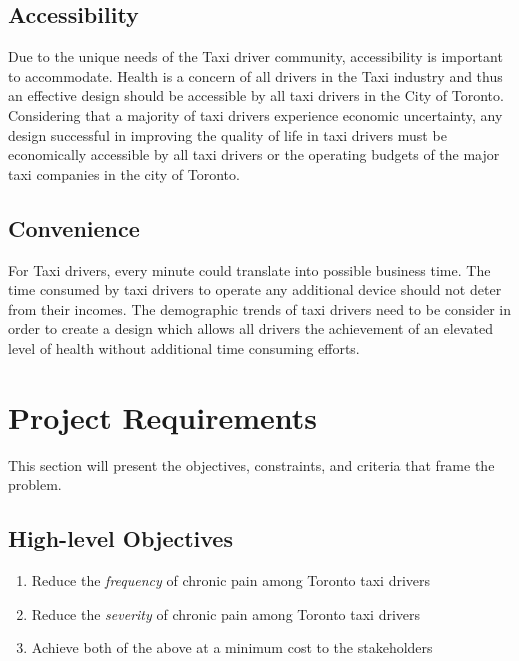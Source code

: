 \documentclass[11pt]{article}
\begin{document}
\subsection{Accessibility}
Due to the unique needs of the Taxi driver community, accessibility is 
important to accommodate. Health is a concern of all drivers in the Taxi 
industry and thus an effective design should be accessible by all taxi 
drivers in the City of Toronto. Considering that a majority of taxi 
drivers experience economic uncertainty\cite{facey2003health}, any design 
successful in improving the quality of life in taxi drivers must be
economically accessible by all taxi drivers or the operating 
budgets of the major taxi companies in the city of Toronto. 
 
\subsection{Convenience}
For Taxi drivers, every minute could translate into possible business 
time\cite{ facey2003health}. The time consumed by taxi drivers to operate 
any additional device should not deter from their incomes. The demographic 
trends of taxi drivers need to be consider in order to create a design 
which allows all drivers the achievement of an elevated level of health 
without additional time consuming efforts.

\section{Project Requirements}
\label{sec:requirements}
This section will present the objectives, constraints, and criteria 
that frame the problem.

\subsection{High-level Objectives}
\label{sec:high-level-objectives}

\begin{enumerate}
\item Reduce the \emph{frequency} of chronic pain among Toronto taxi drivers
\item Reduce the \emph{severity} of chronic pain among Toronto taxi drivers
\item Achieve both of the above at a minimum cost to the stakeholders
\end{enumerate}
\end{document}
